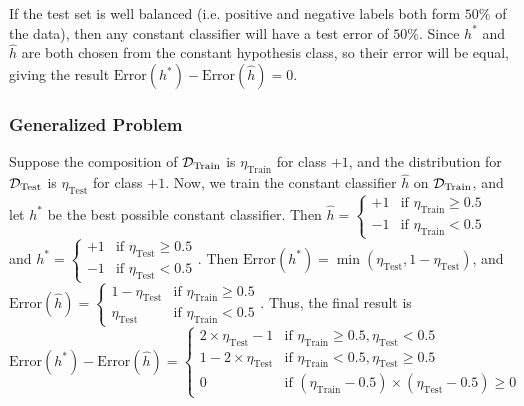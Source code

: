 \documentclass[12pt]{article}
\begin{document}
If the test set is well balanced (i.e. positive and negative labels both form $50\%$ of the data), then any constant classifier will have a test error of $50\%$. Since $h^*$ and $\widehat{h}$ are both chosen from the constant hypothesis class, so their error will be equal, giving the result $\textrm{Error}(h^*)-\textrm{Error}(\widehat{h}) = 0$.

\subsubsection{Generalized Problem}
Suppose the composition of ${\cal D}_{\textrm{Train}}$ is $\eta_{\textrm{Train}}$ for class $+1$, and the distribution for ${\cal D}_{\textrm{Test}}$ is $\eta_{\textrm{Test}}$ for class $+1$. Now, we train the constant classifier $\widehat{h}$ on ${\cal D}_{\textrm{Train}}$, and let $h^*$ be the best possible constant classifier. Then 
$\displaystyle 
    \widehat{h} = \begin{cases}
          +1 & \text{if $\eta_{\textrm{Train}} \geq 0.5$}\\
          -1 & \text{if $\eta_{\textrm{Train}} < 0.5$}
      \end{cases}
$ and
$\displaystyle 
    h^* = \begin{cases}
          +1 & \text{if $\eta_{\textrm{Test}} \geq 0.5$}\\
          -1 & \text{if $\eta_{\textrm{Test}} < 0.5$}
      \end{cases}
$.
\newline \newline
Then $\textrm{Error}(h^*) = \min(\eta_{\textrm{Test}}, 1-\eta_{\textrm{Test}})$, and
$\displaystyle 
    \textrm{Error}(\widehat{h}) = \begin{cases}
          1-\eta_{\textrm{Test}} & \text{if $\eta_{\textrm{Train}} \geq 0.5$}\\
          \eta_{\textrm{Test}} & \text{if $\eta_{\textrm{Train}} < 0.5$}
      \end{cases}
$.
\newline \newline
Thus, the final result is 
$$\displaystyle 
    \textrm{Error}(h^*) - \textrm{Error}(\widehat{h}) = \begin{cases}
          2 \times \eta_{\textrm{Test}}-1 & \text{if $\eta_{\textrm{Train}} \geq 0.5, \eta_{\textrm{Test}} < 0.5$}\\
          1-2 \times \eta_{\textrm{Test}} & \text{if $\eta_{\textrm{Train}} < 0.5, \eta_{\textrm{Test}} \geq 0.5$}\\
          0 & \text{if $(\eta_{\textrm{Train}} - 0.5) \times (\eta_{\textrm{Test}} - 0.5) \geq 0$}
      \end{cases}
$$
\end{document}
